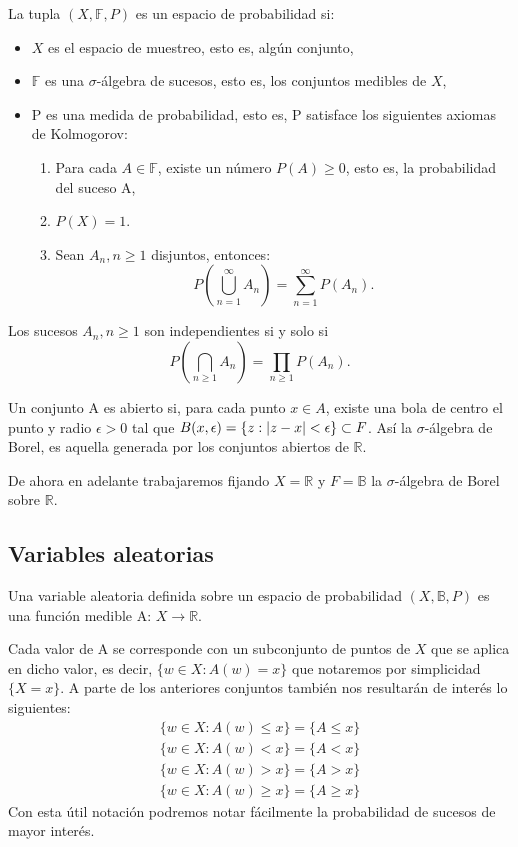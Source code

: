 \documentclass[../proyecto.tex]{memoir}
\begin{document}
\begin{defi}
La tupla $(X, \mathds{F}, P)$ es un espacio de probabilidad si:
\begin{itemize}
\item $X$ es el espacio de muestreo, esto es, algún conjunto,
\item $\mathds{F}$ es una $\sigma$-álgebra de sucesos, esto es, los conjuntos medibles de $X$,
\item P es una medida de probabilidad, 
esto es, P satisface los siguientes axiomas de Kolmogorov:
\begin{enumerate}
\item Para cada $A\in\mathds{F}$, existe un número $P(A) \geq 0$, esto es, la probabilidad del suceso A,
\item $P(X)=1$.
\item Sean ${A_n, n \geq 1}$ disjuntos, entonces: $$
	P \left( \bigcup_{n=1}^{\infty} A_{n} \right) = \sum_{n=1}^{\infty} P(A_n).
$$
\end{enumerate}
\end{itemize}
\end{defi}

\begin{defi}
Los sucesos ${A_n, n \geq 1}$ son independientes si y solo si $$
P \left( \bigcap_{n \geq 1} A_{n} \right) = \prod_{n \geq 1} P(A_n).
$$
\end{defi}

\begin{defi}
Un conjunto A es abierto si, para cada punto $x\in A$, existe una bola de centro el punto y radio $\epsilon > 0$ tal que $B(x,\epsilon)=\{ z : \abs{z-x} < \epsilon\} \subset F$. Así la $\sigma$-álgebra de Borel, es aquella generada por los conjuntos abiertos de $\mathds{R}$.
\end{defi}

De ahora en adelante trabajaremos fijando $X=\mathds{R}$ y $F=\mathds{B}$ la $\sigma$-álgebra de Borel sobre $\mathds{R}$.

\subsection{Variables aleatorias}

\begin{defi}
Una variable aleatoria definida sobre un espacio de probabilidad $(X, \mathds{B}, P)$ es una función medible A: $X \rightarrow \mathds{R}$.
\end{defi}

Cada valor de A se corresponde con un subconjunto de puntos de $X$ que se aplica en dicho valor, es decir, $ \{ w\in X : A(w)=x\}$ que notaremos por simplicidad $\{X = x\}$. A parte de los anteriores conjuntos también nos resultarán de interés lo siguientes:
\begin{align*}
\{ w\in X : A(w) \leq x\} = \{ A \leq x \} \\
\{ w\in X : A(w) < x\} = \{ A < x \} \\
\{ w\in X : A(w) > x\} = \{ A > x \} \\
\{ w\in X : A(w) \geq x\} = \{ A \geq x \}
\end{align*}
Con esta útil notación podremos notar fácilmente la probabilidad de sucesos de mayor interés.
\end{document}
